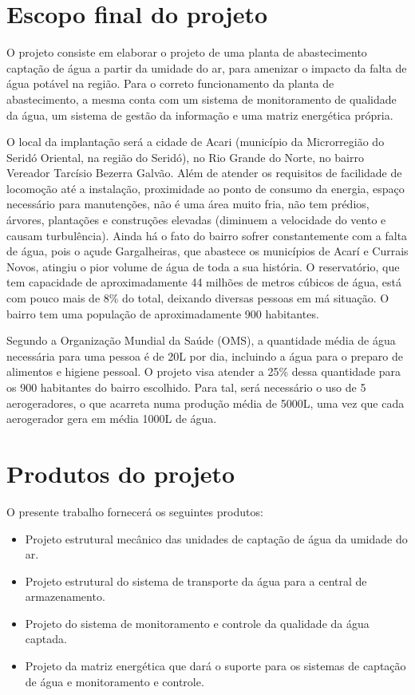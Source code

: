 \section*{Escopo final do projeto}

O projeto consiste em elaborar o projeto de uma planta de abastecimento captação de água a partir da umidade do ar, para amenizar
o impacto da falta de água potável na região. Para o correto funcionamento da planta de abastecimento, a mesma conta com um sistema
de monitoramento de qualidade da água, um sistema de gestão da informação e uma matriz energética própria.

O local da implantação será a cidade de Acari (município da Microrregião do Seridó Oriental, na região do Seridó), no Rio Grande 
do Norte, no bairro Vereador Tarcísio Bezerra Galvão. Além de atender os requisitos de facilidade de locomoção até a instalação,
proximidade ao ponto de consumo da energia, espaço necessário para manutenções, não é uma área muito fria, não tem prédios, árvores,
plantações e construções elevadas (diminuem a velocidade do vento e causam turbulência). Ainda há o fato do bairro sofrer 
constantemente com a falta de água, pois o açude Gargalheiras, que abastece os municípios de Acarí e Currais Novos, atingiu o 
pior volume de água de toda a sua história. O reservatório, que tem capacidade de aproximadamente 44 milhões de metros cúbicos
de água, está com pouco mais de 8\% do total, deixando diversas pessoas em má situação. O bairro tem uma população de 
aproximadamente 900 habitantes.

Segundo a Organização Mundial da Saúde (OMS), a quantidade média de água necessária para uma pessoa é de 20L por dia, incluindo
a água para o preparo de alimentos e higiene pessoal. O projeto visa atender a 25\% dessa quantidade para os 900 habitantes
do bairro escolhido. Para tal, será necessário o uso de 5 aerogeradores, o que acarreta numa produção média de 5000L, uma vez
que cada aerogerador gera em média 1000L de água.
  
\section*{Produtos do projeto}

  O presente trabalho fornecerá os seguintes produtos:
  
  \begin{itemize}
    \item Projeto estrutural mecânico das unidades de captação de água da umidade do ar.
    \item Projeto estrutural do sistema de transporte da água para a central de armazenamento.
    \item Projeto do sistema de monitoramento e controle da qualidade da água captada.
    \item Projeto da matriz energética que dará o suporte para os sistemas de captação de água e monitoramento e controle.
  \end{itemize}

